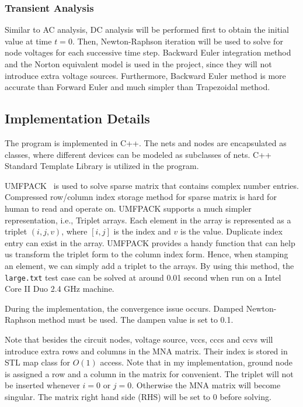 \documentclass{article}
\begin{document}
\subsubsection{Transient Analysis}
Similar to AC analysis, DC analysis will be performed first to obtain 
the initial value at time $t=0$.
Then, Newton-Raphson iteration will be used to solve for node voltages
for each successive time step. 
Backward Euler integration method and the Norton equivalent model 
is used in the project, since they will not introduce extra voltage sources.
Furthermore, Backward Euler method is more accurate than Forward Euler 
and much simpler than Trapezoidal method.

\subsection{Implementation Details}
The program is implemented in C++. The nets and nodes are encapsulated as classes,
where different devices can be modeled as subclasses of nets.
C++ Standard Template Library is utilized in the program.

UMFPACK~\cite{umfpack} is used 
to solve sparse matrix that contains complex number entries.
Compressed row/column index storage method for sparse matrix is hard for human to read and
operate on.  UMFPACK supports a much simpler representation, i.e.,
Triplet arrays. Each element in the array is represented as a triplet $(i,j,v)$, 
where $[i,j]$ is the index and $v$ is the value.
Duplicate index entry can exist in the array. UMFPACK provides a 
handy function that can help us transform the triplet form to the column index form.
Hence, when stamping an element, we can simply add a triplet to the arrays.
By using this method, the \texttt{large.txt} test case can be solved 
at around 0.01 second when run on a Intel Core II Duo 2.4 GHz machine.

During the implementation, the convergence issue occurs.
Damped Newton-Raphson method must be used. The dampen value is set to 0.1.

Note that besides the circuit nodes, voltage source, vccs, cccs and ccvs 
will introduce extra rows and columns in the MNA matrix.
Their index is stored in STL map class for $O(1)$ access.
Note that in my implementation, ground node is assigned a row and a column 
in the matrix for convenient. The triplet will not be inserted whenever 
$i=0$ or $j=0$.  Otherwise the MNA matrix will become singular.
The matrix right hand side (RHS) will be set to 0 before solving.
\end{document}
